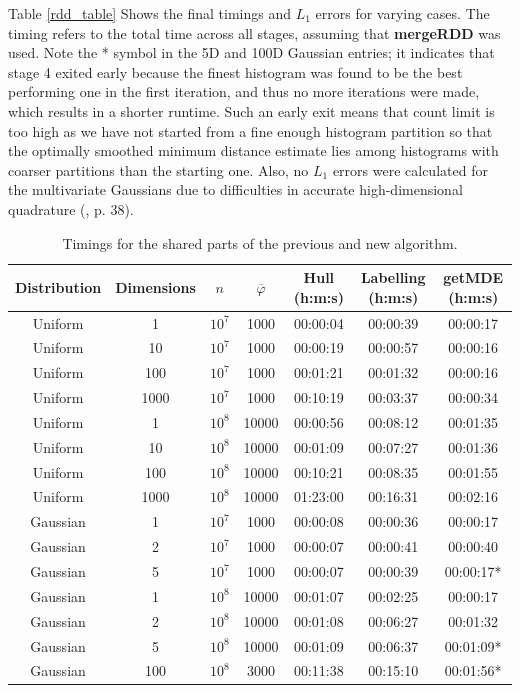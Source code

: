 \documentclass{report}
\begin{document}
Table \ref{rdd_table} Shows the final timings and $L_1$ errors for varying cases. The timing refers to the total time across all stages, assuming that \textbf{mergeRDD} was used.
Note the * symbol in the 5D and 100D Gaussian entries; it indicates that stage 4 exited early because the finest histogram was found to be the best performing one in the first iteration, and thus
no more iterations were made, which results in a shorter runtime. 
Such an early exit means that count limit is too high as we have not started from a fine enough histogram partition so that the optimally smoothed minimum distance estimate lies among histograms with coarser partitions than the starting one. 
Also, no $L_1$ errors were calculated for the multivariate Gaussians due to difficulties in accurate high-dimensional quadrature (\cite{Scalable Algorithms}, p. 38).


\begin{table}
\begin{center}
\begin{tabular}{|c  c  c | c | c | c | c |}
	\hline
	Distribution &  Dimensions &  $n$ & $\overline{\varphi}$ & Hull (h:m:s) & Labelling (h:m:s) & getMDE (h:m:s) \\
	\hline
	Uniform	& 1  & 		$10^7$ & 1000 &  00:00:04  & 00:00:39 & 00:00:17 \\
	Uniform	& 10  & 	$10^7$ & 1000 &  00:00:19  & 00:00:57 & 00:00:16 \\
	Uniform	& 100  & 	$10^7$ & 1000 &  00:01:21  & 00:01:32 & 00:00:16 \\
	Uniform	& 1000  & 	$10^7$ & 1000 &  00:10:19  & 00:03:37 & 00:00:34 \\
	\hline
	Uniform & 1  & 		$10^8$ & 10000 & 00:00:56  & 00:08:12 & 00:01:35  \\
	Uniform & 10  & 	$10^8$ & 10000 & 00:01:09  & 00:07:27 & 00:01:36  \\
	Uniform & 100  & 	$10^8$ & 10000 & 00:10:21  & 00:08:35 & 00:01:55  \\
	Uniform & 1000  & 	$10^8$ & 10000 & 01:23:00  & 00:16:31 & 00:02:16  \\
	\hline
	\hline
	Gaussian  & 1  & 	$10^7$ & 1000 &  00:00:08 &  00:00:36 & 00:00:17   \\
	Gaussian  & 2  & 	$10^7$ & 1000 &  00:00:07 &  00:00:41 & 00:00:40   \\
	Gaussian  & 5  & 	$10^7$ & 1000 &  00:00:07 &  00:00:39 & 00:00:17*  \\
	\hline
	Gaussian  & 1  & 	$10^8$ & 10000 & 00:01:07 &  00:02:25 & 00:00:17  \\
	Gaussian  & 2  & 	$10^8$ & 10000 & 00:01:08 &  00:06:27 & 00:01:32  \\
	Gaussian  & 5  & 	$10^8$ & 10000 & 00:01:09 &  00:06:37 & 00:01:09* \\
	Gaussian  & 100  & 	$10^8$ & 3000 &  00:11:38 &  00:15:10 & 00:01:56* \\
	\hline
\end{tabular}
\end{center}
\caption{Timings for the shared parts of the previous and new algorithm.}
\label{shared_table}
\end{table}
\end{document}
